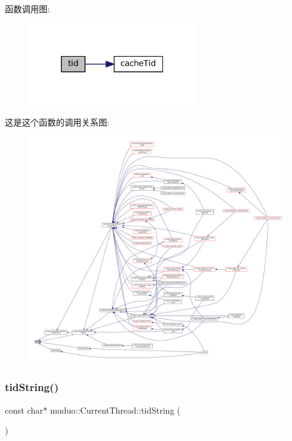 函数调用图\+:
\nopagebreak
\begin{figure}[H]
\begin{center}
\leavevmode
\includegraphics[width=205pt]{namespacemuduo_1_1CurrentThread_a27129392a2d642e96188636257bf13ca_cgraph}
\end{center}
\end{figure}
这是这个函数的调用关系图\+:
\nopagebreak
\begin{figure}[H]
\begin{center}
\leavevmode
\includegraphics[width=350pt]{namespacemuduo_1_1CurrentThread_a27129392a2d642e96188636257bf13ca_icgraph}
\end{center}
\end{figure}
\mbox{\label{namespacemuduo_1_1CurrentThread_a66a1e1728583966e9568ae57562a6e93}} 
\subsubsection{\texorpdfstring{tid\+String()}{tidString()}}
{\footnotesize\ttfamily const char$\ast$ muduo\+::\+Current\+Thread\+::tid\+String (\begin{DoxyParamCaption}{ }\end{DoxyParamCaption})\hspace{0.3cm}{\ttfamily [inline]}}



